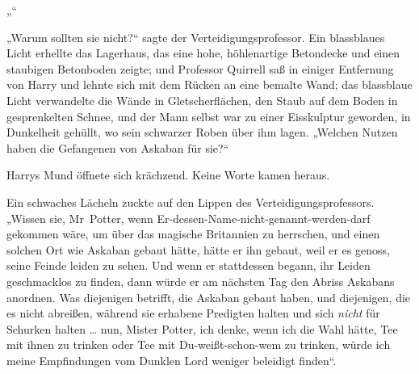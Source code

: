 „“

„Warum sollten sie nicht?“ sagte der Verteidigungsprofessor. Ein blassblaues Licht erhellte das Lagerhaus, das eine hohe, höhlenartige Betondecke und einen staubigen Betonboden zeigte; und Professor Quirrell saß in einiger Entfernung von Harry und lehnte sich mit dem Rücken an eine bemalte Wand; das blassblaue Licht verwandelte die Wände in Gletscherflächen, den Staub auf dem Boden in gesprenkelten Schnee, und der Mann selbst war zu einer Eisskulptur geworden, in Dunkelheit gehüllt, wo sein schwarzer Roben über ihm lagen.
„Welchen Nutzen haben die Gefangenen von Askaban für sie?“

Harrys Mund öffnete sich krächzend. Keine Worte kamen heraus.

Ein schwaches Lächeln zuckte auf den Lippen des Verteidigungsprofessors.
„Wissen sie, Mr~Potter, wenn Er-dessen-Name-nicht-genannt-werden-darf gekommen wäre, um über das magische Britannien zu herrschen, und einen solchen Ort wie Askaban gebaut hätte, hätte er ihn gebaut, weil er es genoss, seine Feinde leiden zu sehen. Und wenn er stattdessen begann, ihr Leiden geschmacklos zu finden, dann würde er am nächsten Tag den Abriss Askabans anordnen. Was diejenigen betrifft, die Askaban gebaut haben, und diejenigen, die es nicht abreißen, während sie erhabene Predigten halten und sich \emph{nicht} für Schurken halten … nun, Mister Potter, ich denke, wenn ich die Wahl hätte, Tee mit ihnen zu trinken oder Tee mit Du-weißt-schon-wem zu trinken, würde ich meine Empfindungen vom Dunklen Lord weniger beleidigt finden“.

